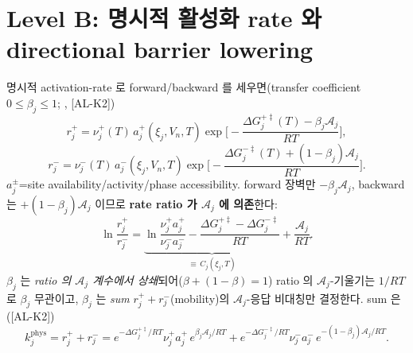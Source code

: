 \documentclass[11pt,a4paper]{article}
\newcommand{\AL}[1]{\textsf{[AL-#1]}}
\begin{document}
\section{Level B: 명시적 활성화 rate 와 directional barrier lowering}\label{sec:ch3_levelB}
명시적 activation-rate 로 forward/backward 를 세우면(transfer coefficient $0\le\beta_j\le1$;
\cite{evanspolanyi1938,bardfaulkner,bazant2013}, \AL{K2})
\begin{equation}
r_j^+=\nu_j^+(T)\,a_j^+(\xi_j,V_n,T)\exp\!\Big[-\frac{\Delta G_j^{+\ddagger}(T)-\beta_j\mathcal A_j}{RT}\Big],
\label{eq:ch3_rplus}
\end{equation}
\begin{equation}
r_j^-=\nu_j^-(T)\,a_j^-(\xi_j,V_n,T)\exp\!\Big[-\frac{\Delta G_j^{-\ddagger}(T)+(1-\beta_j)\mathcal A_j}{RT}\Big].
\label{eq:ch3_rminus}
\end{equation}
$a_j^\pm$=site availability/activity/phase accessibility. forward 장벽만 $-\beta_j\mathcal A_j$, backward 는
$+(1-\beta_j)\mathcal A_j$ 이므로 \textbf{rate ratio 가 $\mathcal A_j$ 에 의존}한다:
\begin{equation}
\ln\frac{r_j^+}{r_j^-}=\underbrace{\ln\frac{\nu_j^+a_j^+}{\nu_j^-a_j^-}-\frac{\Delta G_j^{+\ddagger}-\Delta G_j^{-\ddagger}}{RT}}_{\equiv\,C_j(\xi_j,T)}
+\frac{\mathcal A_j}{RT}.
\label{eq:ch3_ratio_B}
\end{equation}
$\beta_j$ 는 \emph{ratio 의 $\mathcal A_j$ 계수에서 상쇄}되어($\beta+(1-\beta)=1$) ratio 의
$\mathcal A_j$-기울기는 $1/RT$ 로 $\beta_j$ 무관이고, $\beta_j$ 는 \emph{sum} $r_j^++r_j^-$(mobility)의
$\mathcal A_j$-응답 비대칭만 결정한다. sum 은(\AL{K2})
\begin{equation}
k_j^{\mathrm{phys}}=r_j^++r_j^-
=e^{-\Delta G_j^{+\ddagger}/RT}\nu_j^+a_j^+\,e^{\beta_j\mathcal A_j/RT}
+e^{-\Delta G_j^{-\ddagger}/RT}\nu_j^-a_j^-\,e^{-(1-\beta_j)\mathcal A_j/RT}.
\label{eq:ch3_ksum}
\end{equation}
\end{document}
